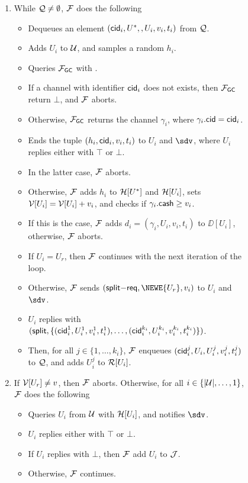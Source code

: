 \begin{figure*}[!t]
{{\begin{enumerate}
	\item While $\mathcal{Q} \neq \emptyset$, $\mathcal{F}$ does the following
	\begin{itemize}[label=-]
		\item Dequeues an element $(\mathsf{cid}_i,U^*,,U_i,v_i,t_i)$ from $\mathcal{Q}$.
		\item Adds $U_i$ to $\mathcal{U}$, and samples a random $h_i$.
		\item Queries $\mathcal{F}_{\mathsf{GC}}$ with .
		\item If a channel with identifier $\mathsf{cid}_i$ does not exists, then $\mathcal{F}_{\mathsf{GC}}$ return 
		$\bot$, and $\mathcal{F}$ aborts.
		\item Otherwise, $\mathcal{F}_{\mathsf{GC}}$ returns the channel $\gamma_i$, where $\gamma_i.\mathsf{cid} = 
		\mathsf{cid}_i$.
		\item Ends the tuple $(h_i, \mathsf{cid}_i, v_i, t_i)$ to $U_i$ and $\sdv$, where $U_i$ replies 
		either with $\top$ or $\bot$.
		\item In the latter case, $\mathcal{F}$ aborts.
		\item Otherwise, $\mathcal{F}$ adds $h_i$ to $\mathcal{H}[U^*]$ and $\mathcal{H}[U_i]$, sets $\mathcal{V}[U_i] = \mathcal{V}[U_i] 
		+ v_i$, and checks if $\gamma_i.\mathsf{cash} \geq v_i$.
		\item If this is the case, $\mathcal{F}$ adds $d_i = (\gamma_i,U_i,v_i,t_i)$ to $\DD[U_i]$, 
		otherwise, $\mathcal{F}$ aborts.
		\item If $U_i = U_r$, then $\mathcal{F}$ continues with the next iteration of the loop.
		\item Otherwise, $\mathcal{F}$ sends $(\mathsf{split}\mathsf{-req}, \NEWE{U_r}, v_i)$ to $U_i$ 
		and $\sdv$. 
		\item $U_i$ replies with $(\mathsf{split}, \{(\mathsf{cid}_i^1,U_i^1,v_i^1,t_i^1),\ldots,
		(\mathsf{cid}_i^{k_i},U_i^{k_i},v_i^{k_i},t_i^{k_i})\})$.
		\item Then, for all $j \in \{1,\ldots,k_i\}$, $\mathcal{F}$ enqueues 
		$(\mathsf{cid}_i^j,U_i,U_i^j,v_i^j,t_i^j)$ to $\mathcal{Q}$, and adds $U_i^j$ to $\mathcal{R}[U_i]$.
	\end{itemize}
	
	
	
	\item If $\mathcal{V}[U_r] \neq v$, then $\mathcal{F}$ aborts. Otherwise, for all $i \in \{|\mathcal{U}|,\ldots,1\}$, 
	$\mathcal{F}$ does the following
	\begin{itemize}[label=-]
		\item Queries $U_i$ from $\mathcal{U}$ with $\mathcal{H}[U_i]$, and notifies $\sdv$.
		\item $U_i$ replies either with $\top$ or $\bot$.
		\item If $U_i$ replies with $\bot$, then $\mathcal{F}$ add $U_i$ to $\mathcal{J}$. 
		\item Otherwise, $\mathcal{F}$ continues.
	\end{itemize}
	

\end{enumerate}}}
\end{figure*}
